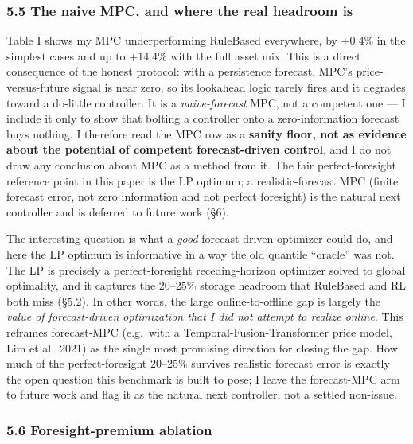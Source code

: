 \documentclass[
  11pt,
]{article}
\begin{document}
\subsubsection{5.5 The naive MPC, and where the real headroom
is}\label{the-naive-mpc-and-where-the-real-headroom-is}

Table I shows my MPC underperforming RuleBased everywhere, by +0.4\% in
the simplest cases and up to +14.4\% with the full asset mix. This is a
direct consequence of the honest protocol: with a persistence forecast,
MPC's price-versus-future signal is near zero, so its lookahead logic
rarely fires and it degrades toward a do-little controller. It is a
\emph{naive-forecast} MPC, not a competent one --- I include it only to
show that bolting a controller onto a zero-information forecast buys
nothing. I therefore read the MPC row as a \textbf{sanity floor, not as
evidence about the potential of competent forecast-driven control}, and
I do not draw any conclusion about MPC as a method from it. The fair
perfect-foresight reference point in this paper is the LP optimum; a
realistic-forecast MPC (finite forecast error, not zero information and
not perfect foresight) is the natural next controller and is deferred to
future work (§6).

The interesting question is what a \emph{good} forecast-driven optimizer
could do, and here the LP optimum is informative in a way the old
quantile ``oracle'' was not. The LP is precisely a perfect-foresight
receding-horizon optimizer solved to global optimality, and it captures
the 20--25\% storage headroom that RuleBased and RL both miss (§5.2). In
other words, the large online-to-offline gap is largely the \emph{value
of forecast-driven optimization that I did not attempt to realize
online}. This reframes forecast-MPC (e.g.~with a
Temporal-Fusion-Transformer price model, Lim et al.~2021) as the single
most promising direction for closing the gap. How much of the
perfect-foresight 20--25\% survives realistic forecast error is exactly
the open question this benchmark is built to pose; I leave the
forecast-MPC arm to future work and flag it as the natural next
controller, not a settled non-issue.

\subsubsection{5.6 Foresight-premium
ablation}\label{foresight-premium-ablation}
\end{document}
